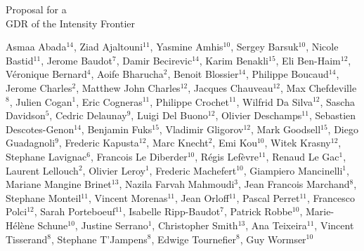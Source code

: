 \documentclass{article}
\begin{document}
\vspace{10mm}

\begin{titlepage}
\begin{center}
\Huge{Proposal for a \\ GDR of the Intensity Frontier}\\[0.5cm]
%

\end{center}

\vspace{30mm}
  
\small
\noindent
Asmaa	Abada$^{14}$, 
Ziad	Ajaltouni$^{11}$, 	
Yasmine	Amhis$^{10}$, 
Sergey     Barsuk$^{10}$,
Nicole	Bastid$^{11}$, 
Jerome	Baudot$^{7}$, 	
Damir	Becirevic$^{14}$, 
Karim       Benakli$^{15}$, 
Eli 	Ben-Haim$^{12}$, 
V\'{e}ronique	Bernard$^{4}$, 	
Aoife   Bharucha$^{2}$, 
Benoit	Blossier$^{14}$, 
Philippe	Boucaud$^{14}$, 	
Jerome	        Charles$^{2}$, 
Matthew John	Charles$^{12}$, 
Jacques	Chauveau$^{12}$, 
Max	Chefdeville$^{8}$, 	
Julien	Cogan$^{1}$, 
Eric	Cogneras$^{11}$, 
Philippe	Crochet$^{11}$, 	
Wilfrid	Da Silva$^{12}$, 
Sascha	Davidson$^{5}$, 	
Cedric	Delaunay$^{9}$, 	
Luigi 	Del Buono$^{12}$, 
Olivier	Deschamps$^{11}$, 	
Sebastien	Descotes-Genon$^{14}$, 
Benjamin	Fuks$^{15}$, 	
Vladimir 	Gligorov$^{12}$, 
Mark 	Goodsell$^{15}$, 	
Diego	Guadagnoli$^{9}$, 
Frederic	Kapusta$^{12}$, 
Marc	        Knecht$^{2}$, 
Emi	        Kou$^{10}$, 
Witek	Krasny$^{12}$, 
Stephane	Lavignac$^{6}$, 	
Francois	Le Diberder$^{10}$, 
R\'{e}gis	Lefèvre$^{11}$, 	
Renaud 	Le Gac$^{1}$, 	
Laurent	Lellouch$^{2}$, 
Olivier	Leroy$^{1}$, 
Frederic 	  Machefert$^{10}$, 	
Giampiero	  Mancinelli$^{1}$, 
Mariane	  Mangine Brinet$^{13}$, 
Nazila Farvah	Mahmoudi$^{3}$, 	
Jean Francois	Marchand$^{8}$, 	
Stephane	Monteil$^{11}$, 
Vincent	Morenas$^{11}$, 	
Jean 	Orloff$^{11}$, 	
Pascal	   Perret$^{11}$, 	
Francesco	  Polci$^{12}$, 
Sarah	  Porteboeuf$^{11}$, 
Isabelle	  Ripp-Baudot$^{7}$, 
Patrick	  Robbe$^{10}$, 
Marie-H\'{e}lène	Schune$^{10}$, 
Justine	        Serrano$^{1}$, 
Christopher	Smith$^{13}$, 	
Ana	         Teixeira$^{11}$, 	
Vincent	Tisserand$^{8}$, 
Stephane 	T'Jampens$^{8}$, 	
Edwige 	Tournefier$^{8}$, 
Guy	Wormser$^{10}$	


\end{titlepage}
\end{document}
